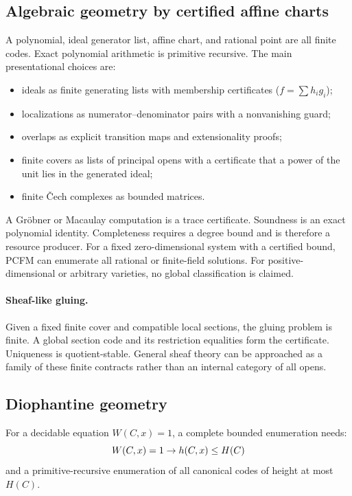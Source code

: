 \subsection{Algebraic geometry by certified affine charts}

A polynomial, ideal generator list, affine chart, and rational point are all
finite codes.  Exact polynomial arithmetic is primitive recursive.  The main
presentational choices are:

\begin{itemize}
\item ideals as finite generating lists with membership certificates
(\(f=\sum h_i g_i\));
\item localizations as numerator--denominator pairs with a nonvanishing guard;
\item overlaps as explicit transition maps and extensionality proofs;
\item finite covers as lists of principal opens with a certificate that a
power of the unit lies in the generated ideal;
\item finite \v{C}ech complexes as bounded matrices.
\end{itemize}

A Gr\"obner or Macaulay computation is a trace certificate.  Soundness is an
exact polynomial identity.  Completeness requires a degree bound and is
therefore a resource producer.  For a fixed zero-dimensional system with a
certified bound, PCFM can enumerate all rational or finite-field solutions.
For positive-dimensional or arbitrary varieties, no global classification is
claimed.

\paragraph{Sheaf-like gluing.}
Given a fixed finite cover and compatible local sections, the gluing problem
is finite.  A global section code and its restriction equalities form the
certificate.  Uniqueness is quotient-stable.  General sheaf theory can be
approached as a family of these finite contracts rather than an internal
category of all opens.

\subsection{Diophantine geometry}

For a decidable equation \(W(C,x)=1\), a complete bounded enumeration needs:
\[
  W(C,x)=1\rightarrow h(C,x)\le H(C)
\]
and a primitive-recursive enumeration of all canonical codes of height at most
\(H(C)\).

